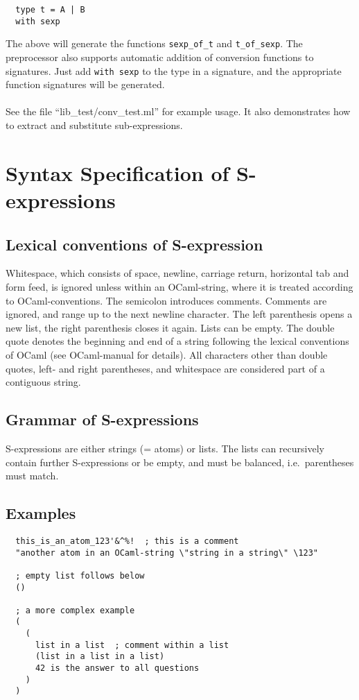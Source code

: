 \documentclass[a4paper]{article}
\begin{document}
\begin{verbatim}
  type t = A | B
  with sexp
\end{verbatim}

The above will generate the functions \verb=sexp_of_t= and
\verb=t_of_sexp=.  The preprocessor also supports automatic addition
of conversion functions to signatures.  Just add \verb=with sexp= to
the type in a signature, and the appropriate function signatures will
be generated.\\
\\
See the file ``lib\_test/conv\_test.ml'' for example usage.  It also
demonstrates how to extract and substitute sub-expressions.

\section{Syntax Specification of S-expressions}

\subsection{Lexical conventions of S-expression}

Whitespace, which consists of space, newline, carriage return, horizontal
tab and form feed, is ignored unless within an OCaml-string, where it
is treated according to OCaml-conventions.  The semicolon introduces
comments.  Comments are ignored, and range up to the next newline
character.  The left parenthesis opens a new list, the right parenthesis
closes it again.  Lists can be empty.  The double quote denotes the
beginning and end of a string following the lexical conventions of OCaml
(see OCaml-manual for details).  All characters other than double quotes,
left- and right parentheses, and whitespace are considered part of a
contiguous string.

\subsection{Grammar of S-expressions}

S-expressions are either strings (= atoms) or lists. The lists can
recursively contain further S-expressions or be empty, and must be
balanced, i.e.\ parentheses must match.

\subsection{Examples}

{\samepage
\begin{verbatim}
  this_is_an_atom_123'&^%!  ; this is a comment
  "another atom in an OCaml-string \"string in a string\" \123"

  ; empty list follows below
  ()

  ; a more complex example
  (
    (
      list in a list  ; comment within a list
      (list in a list in a list)
      42 is the answer to all questions
    )
  )
\end{verbatim}
}
\end{document}
